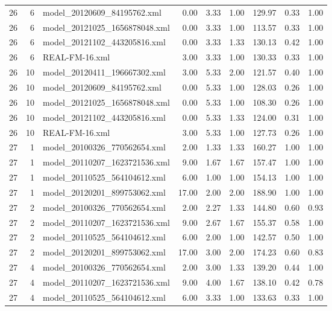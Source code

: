 \begin{table}[ht]
\begin{tabular}{rrlrrrrrr}
   26 &   6 & model\_20120609\_84195762.xml & 0.00 & 3.33 & 1.00 & 129.97 & 0.33 & 1.00 \\ 
   26 &   6 & model\_20121025\_1656878048.xml & 0.00 & 3.33 & 1.00 & 113.57 & 0.33 & 1.00 \\ 
   26 &   6 & model\_20121102\_443205816.xml & 0.00 & 3.33 & 1.33 & 130.13 & 0.42 & 1.00 \\ 
   26 &   6 & REAL-FM-16.xml & 3.00 & 3.33 & 1.00 & 130.33 & 0.33 & 1.00 \\ 
   26 &  10 & model\_20120411\_196667302.xml & 3.00 & 5.33 & 2.00 & 121.57 & 0.40 & 1.00 \\ 
   26 &  10 & model\_20120609\_84195762.xml & 0.00 & 5.33 & 1.00 & 128.03 & 0.26 & 1.00 \\ 
   26 &  10 & model\_20121025\_1656878048.xml & 0.00 & 5.33 & 1.00 & 108.30 & 0.26 & 1.00 \\ 
   26 &  10 & model\_20121102\_443205816.xml & 0.00 & 5.33 & 1.33 & 124.00 & 0.31 & 1.00 \\ 
   26 &  10 & REAL-FM-16.xml & 3.00 & 5.33 & 1.00 & 127.73 & 0.26 & 1.00 \\ 
   27 &   1 & model\_20100326\_770562654.xml & 2.00 & 1.33 & 1.33 & 160.27 & 1.00 & 1.00 \\ 
   27 &   1 & model\_20110207\_1623721536.xml & 9.00 & 1.67 & 1.67 & 157.47 & 1.00 & 1.00 \\ 
   27 &   1 & model\_20110525\_564104612.xml & 6.00 & 1.00 & 1.00 & 154.13 & 1.00 & 1.00 \\ 
   27 &   1 & model\_20120201\_899753062.xml & 17.00 & 2.00 & 2.00 & 188.90 & 1.00 & 1.00 \\ 
   27 &   2 & model\_20100326\_770562654.xml & 2.00 & 2.27 & 1.33 & 144.80 & 0.60 & 0.93 \\ 
   27 &   2 & model\_20110207\_1623721536.xml & 9.00 & 2.67 & 1.67 & 155.37 & 0.58 & 1.00 \\ 
   27 &   2 & model\_20110525\_564104612.xml & 6.00 & 2.00 & 1.00 & 142.57 & 0.50 & 1.00 \\ 
   27 &   2 & model\_20120201\_899753062.xml & 17.00 & 3.00 & 2.00 & 174.23 & 0.60 & 0.83 \\ 
   27 &   4 & model\_20100326\_770562654.xml & 2.00 & 3.00 & 1.33 & 139.20 & 0.44 & 1.00 \\ 
   27 &   4 & model\_20110207\_1623721536.xml & 9.00 & 4.00 & 1.67 & 138.10 & 0.42 & 0.78 \\ 
   27 &   4 & model\_20110525\_564104612.xml & 6.00 & 3.33 & 1.00 & 133.63 & 0.33 & 1.00 \\ 

\end{tabular}
\end{table}
